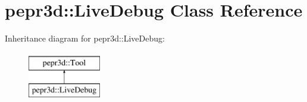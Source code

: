 \hypertarget{classpepr3d_1_1_live_debug}{}\section{pepr3d\+::Live\+Debug Class Reference}
\label{classpepr3d_1_1_live_debug}
Inheritance diagram for pepr3d\+::Live\+Debug\+:\begin{figure}[H]
\begin{center}
\leavevmode
\includegraphics[height=2.000000cm]{classpepr3d_1_1_live_debug}
\end{center}
\end{figure}
